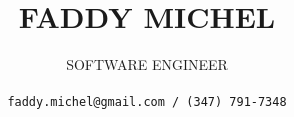 \title{
\uppercase{Faddy Michel}
}

\author{
\uppercase{Software Engineer}\\ \\
\texttt{faddy.michel@gmail.com / (347) 791-7348}
}

\date{}

\maketitle
